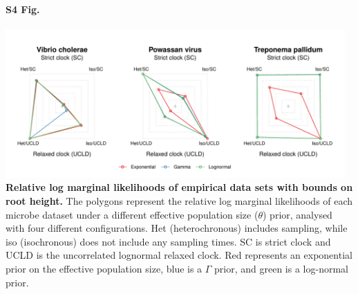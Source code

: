 \documentclass[10pt,letterpaper]{article}
\begin{document}
 \paragraph*{S4 Fig.}
\label{S4_Fig}
	\begin{center}
		\includegraphics[width=13cm]{sandbox_figures/polygon_plot_bound.pdf}\newline
		\textbf{Relative log marginal likelihoods of empirical data sets with bounds on root height.} The polygons represent the relative log marginal likelihoods of each microbe dataset under a different effective population size ($\theta$) prior, analysed with four different configurations. Het (heterochronous) includes sampling, while iso (isochronous) does not include any sampling times. SC is strict clock and UCLD is the uncorrelated lognormal relaxed clock. Red represents an exponential prior on the effective population size, blue is a $\Gamma$ prior, and green is a log-normal prior.
	\end{center}
\end{document}
